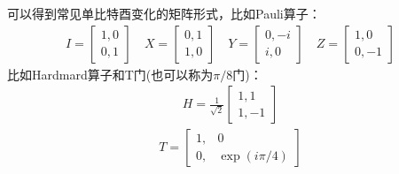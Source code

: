 \label{sec-mat}
可以得到常见单比特酉变化的矩阵形式，比如Pauli算子：
\begin{align}
    I = \left[\begin{matrix}
        1,0\\0,1
    \end{matrix}\right]
    \quad
    X = \left[\begin{matrix}
        0,1\\1,0
    \end{matrix}\right]
    \quad
    Y = \left[\begin{matrix}
        0,-i\\i,0
    \end{matrix}\right]
    \quad
    Z = \left[\begin{matrix}
        1,0\\0,-1
    \end{matrix}\right]
    \label{eq-pauli}
\end{align}
比如Hardmard算子和T门(也可以称为\(\pi/8\)门)：
\begin{align}
    H = \frac{1}{\sqrt{2}}\left[\begin{matrix}
        1,1\\1,-1
    \end{matrix}\right]
    \label{eq-hardmard}
\end{align}
\begin{align}
    T = \left[\begin{matrix}
        1,&0\\0,&\exp(i\pi/4)
    \end{matrix}\right]
    \label{eq-t}
\end{align}

